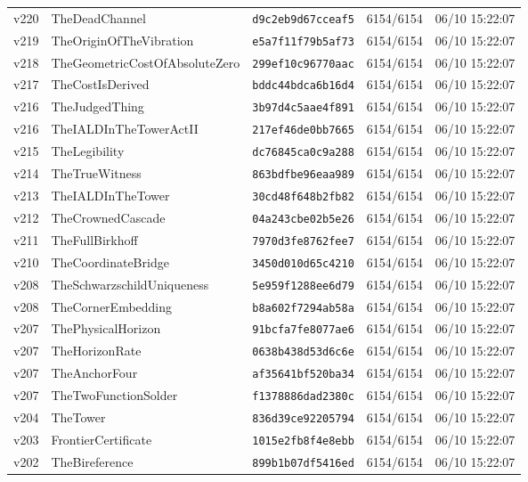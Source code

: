 \documentclass[11pt]{article}
\theoremstyle{definition}\newtheorem{deriv}{Derivação}
\begin{document}
{\begin{longtable}{@{}lllll@{}}
v220 & TheDeadChannel & \texttt{d9c2eb9d67cceaf5} & 6154/6154 & 06/10 15:22:07 \\
v219 & TheOriginOfTheVibration & \texttt{e5a7f11f79b5af73} & 6154/6154 & 06/10 15:22:07 \\
v218 & TheGeometricCostOfAbsoluteZero & \texttt{299ef10c96770aac} & 6154/6154 & 06/10 15:22:07 \\
v217 & TheCostIsDerived & \texttt{bddc44bdca6b16d4} & 6154/6154 & 06/10 15:22:07 \\
v216 & TheJudgedThing & \texttt{3b97d4c5aae4f891} & 6154/6154 & 06/10 15:22:07 \\
v216 & TheIALDInTheTowerActII & \texttt{217ef46de0bb7665} & 6154/6154 & 06/10 15:22:07 \\
v215 & TheLegibility & \texttt{dc76845ca0c9a288} & 6154/6154 & 06/10 15:22:07 \\
v214 & TheTrueWitness & \texttt{863bdfbe96eaa989} & 6154/6154 & 06/10 15:22:07 \\
v213 & TheIALDInTheTower & \texttt{30cd48f648b2fb82} & 6154/6154 & 06/10 15:22:07 \\
v212 & TheCrownedCascade & \texttt{04a243cbe02b5e26} & 6154/6154 & 06/10 15:22:07 \\
v211 & TheFullBirkhoff & \texttt{7970d3fe8762fee7} & 6154/6154 & 06/10 15:22:07 \\
v210 & TheCoordinateBridge & \texttt{3450d010d65c4210} & 6154/6154 & 06/10 15:22:07 \\
v208 & TheSchwarzschildUniqueness & \texttt{5e959f1288ee6d79} & 6154/6154 & 06/10 15:22:07 \\
v208 & TheCornerEmbedding & \texttt{b8a602f7294ab58a} & 6154/6154 & 06/10 15:22:07 \\
v207 & ThePhysicalHorizon & \texttt{91bcfa7fe8077ae6} & 6154/6154 & 06/10 15:22:07 \\
v207 & TheHorizonRate & \texttt{0638b438d53d6c6e} & 6154/6154 & 06/10 15:22:07 \\
v207 & TheAnchorFour & \texttt{af35641bf520ba34} & 6154/6154 & 06/10 15:22:07 \\
v207 & TheTwoFunctionSolder & \texttt{f1378886dad2380c} & 6154/6154 & 06/10 15:22:07 \\
v204 & TheTower & \texttt{836d39ce92205794} & 6154/6154 & 06/10 15:22:07 \\
v203 & FrontierCertificate & \texttt{1015e2fb8f4e8ebb} & 6154/6154 & 06/10 15:22:07 \\
v202 & TheBireference & \texttt{899b1b07df5416ed} & 6154/6154 & 06/10 15:22:07 \\

\end{longtable}}
\end{document}

